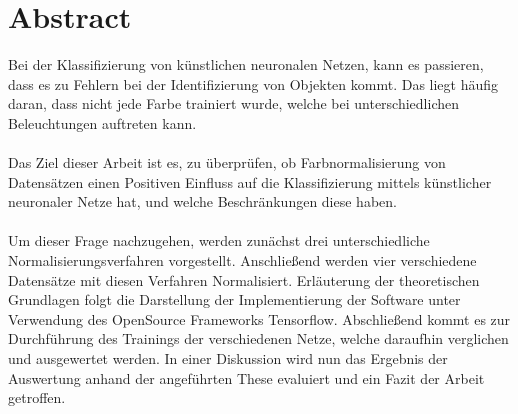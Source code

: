 \chapter*{Abstract}
Bei der Klassifizierung von künstlichen neuronalen Netzen, kann es passieren, dass es zu Fehlern bei der Identifizierung von Objekten kommt. Das liegt häufig daran, dass nicht jede Farbe trainiert wurde, welche bei unterschiedlichen Beleuchtungen auftreten kann. \\\\
Das Ziel dieser Arbeit ist es, zu überprüfen, ob Farbnormalisierung von Datensätzen einen Positiven Einfluss auf die Klassifizierung mittels künstlicher neuronaler Netze hat, und welche Beschränkungen diese haben.\\\\
Um dieser Frage nachzugehen, werden zunächst drei unterschiedliche Normalisierungsverfahren vorgestellt. Anschließend werden vier verschiedene Datensätze mit diesen Verfahren Normalisiert. Erläuterung der theoretischen Grundlagen folgt die Darstellung der Implementierung der Software unter Verwendung des OpenSource Frameworks Tensorflow. Abschließend kommt es zur Durchführung des Trainings der verschiedenen Netze, welche daraufhin verglichen und ausgewertet werden. In einer Diskussion wird nun das Ergebnis der Auswertung anhand der angeführten These evaluiert und ein Fazit der Arbeit getroffen.
